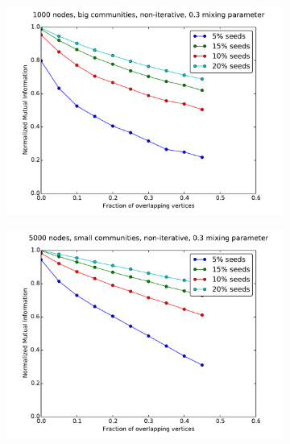 \begin{figure}
\begin{subfigure}{0.5\textwidth}
    \end{subfigure}%
    \begin{subfigure}{0.5\textwidth}
    \includegraphics[width=\linewidth]{allplots/overlap_noniter_3mu_b.pdf}
    \end{subfigure}
    \begin{subfigure}{0.5\textwidth}
    \includegraphics[width=\linewidth]{allplots/overlap_noniter_3mu_c.pdf}
    \end{subfigure}%
    \begin{subfigure}{0.5\textwidth}

\end{subfigure}
\end{figure}
